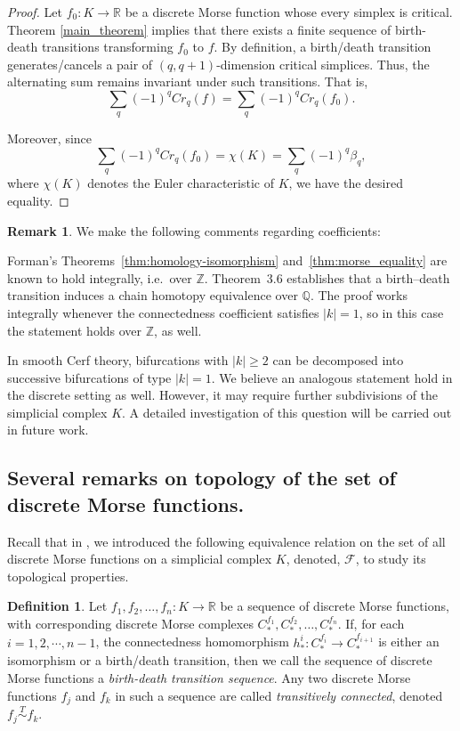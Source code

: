 \documentclass[a4paper,12pt,notitlepage]{amsart}
\theoremstyle{definition}%
\newtheorem{remark}[theorem]{Remark}
\theoremstyle{definition}%
\theoremstyle{definition}%
\newtheorem{definition}[theorem]{Definition}
\newcommand{\Tsim}{\stackrel T\sim }
\newcommand{\R}{\mathbb{R}}
\begin{document}
\begin{proof}
Let $f_0: K\to \R$
be a discrete Morse function whose every simplex is critical.
 Theorem \ref{main_theorem} implies that 
there exists a finite sequence of birth-death transitions
transforming $f_0$ to $f$.
By definition,
a birth/death transition generates/cancels 
a pair of $(q,q+1)$-dimension critical simplices. 
Thus,
the alternating sum remains invariant under such transitions.
That is,
$$\sum_q (-1)^q Cr_q(f)= \sum_q (-1)^q Cr_q(f_0).$$

Moreover,
since 
$$ \sum_q (-1)^q Cr_q(f_0)=\chi(K)=\sum_q (-1)^q \beta_q,$$
where $\chi(K)$ denotes the Euler characteristic of $K$,
we have the desired equality.

\end{proof}
\begin{remark}
We make the following comments regarding coefficients:

Forman’s Theorems~\ref{thm:homology-isomorphism} and~\ref{thm:morse_equality} 
are known to hold integrally, i.e.\ over $\mathbb{Z}$. 
Theorem~3.6 establishes that a birth–death transition induces a chain homotopy equivalence over $\mathbb{Q}$. 
The proof works integrally whenever the connectedness coefficient
 satisfies $|k|=1$, so in this case 
the statement holds over $\mathbb{Z}$, as well.

In smooth Cerf theory, bifurcations with $|k|\geq 2$ can be decomposed into successive bifurcations of type $|k|=1$. 
We believe an analogous statement  hold in the discrete setting as well. 
However, it may require further subdivisions of the simplicial complex $K$. 
A detailed investigation of this question will be carried out in future work.

\end{remark}



\subsection*{Several remarks on topology of the set of discrete Morse functions.}



Recall that in \cite{no.2},
we introduced the following equivalence relation 
on the set of all discrete Morse functions on a simplicial complex
$K$,
denoted, $\mathcal{F}$,
to study its topological properties.



\begin{definition}
Let $f_1, f_2, \ldots,  f_n : K \to \mathbb{R}$
be a sequence of 
discrete Morse functions,
with  corresponding 
discrete Morse complexes $C_{\ast}^{f_1},C_{\ast}^{f_2} ,\ldots, C_{\ast}^{f_n}$.
If, for each $i= 1, 2, \cdots, n-1$, 
the connectedness homomorphism
$h^i_{\ast}: C_{\ast}^{f_i} \to C_{\ast}^{f_{i+1}}$
is either an isomorphism or a  
birth/death
 transition,
then we call the 
sequence 
of discrete Morse functions 
a \textit{birth-death transition sequence}.
Any two 
discrete Morse functions $f_j$ and $f_k$
in such a sequence
are called 
\textit{transitively connected},
denoted $f_j \Tsim  f_k$.
\end{definition}
\end{document}
